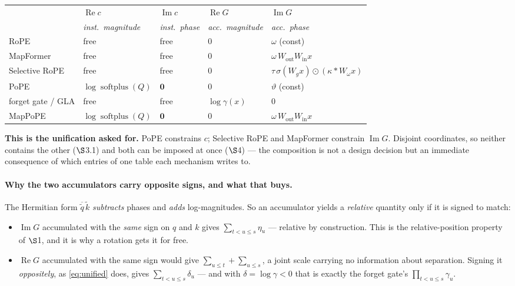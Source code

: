 \documentclass[11pt]{article}
\DeclareMathOperator{\softplus}{softplus}
\begin{document}
\begin{center}\small
\begin{tabular}{lllll}
\toprule
 & $\operatorname{Re}c$ & $\operatorname{Im}c$ & $\operatorname{Re}G$ & $\operatorname{Im}G$ \\
 & \emph{inst.\ magnitude} & \emph{inst.\ phase} & \emph{acc.\ magnitude} & \emph{acc.\ phase} \\
\midrule
RoPE            & free & free & $0$ & $\omega$ (const) \\
MapFormer       & free & free & $0$ & $\omega\,W_{\mathrm{out}}W_{\mathrm{in}}x$ \\
Selective RoPE  & free & free & $0$ & $\tau\,\sigma(W_gx)\odot(\kappa*W_\omega x)$ \\
PoPE            & $\log\softplus(Q)$ & $\mathbf{0}$ & $0$ & $\vartheta$ (const) \\
forget gate / GLA & free & free & $\log\gamma(x)$ & $0$ \\
MapPoPE         & $\log\softplus(Q)$ & $\mathbf{0}$ & $0$ & $\omega\,W_{\mathrm{out}}W_{\mathrm{in}}x$ \\
\bottomrule
\end{tabular}
\end{center}

\noindent \textbf{This is the unification asked for.} PoPE constrains $c$;
Selective RoPE and MapFormer constrain $\operatorname{Im}G$. Disjoint coordinates,
so neither contains the other ($\S$3.1) and both can be imposed at once
($\S$4) --- the composition is not a design decision but an immediate consequence
of which entries of one table each mechanism writes to.

\paragraph{Why the two accumulators carry opposite signs, and what that buys.}
The Hermitian form $\overline{\tilde q}\,\tilde k$ \emph{subtracts} phases and
\emph{adds} log-magnitudes. So an accumulator yields a \emph{relative} quantity
only if it is signed to match:
\begin{itemize}\itemsep2pt
\item $\operatorname{Im}G$ accumulated with the \emph{same} sign on $q$ and $k$
  gives $\sum_{t<u\le s}\eta_u$ --- relative by construction. This is the
  relative-position property of $\S$1, and it is why a rotation gets it for free.
\item $\operatorname{Re}G$ accumulated with the same sign would give
  $\sum_{u\le t} + \sum_{u\le s}$, a joint scale carrying no information about
  separation. Signing it \emph{oppositely}, as \eqref{eq:unified} does, gives
  $\sum_{t<u\le s}\delta_u$ --- and with $\delta = \log\gamma < 0$ that is exactly
  the forget gate's $\prod_{t<u\le s}\gamma_u$.
\end{itemize}
\end{document}
